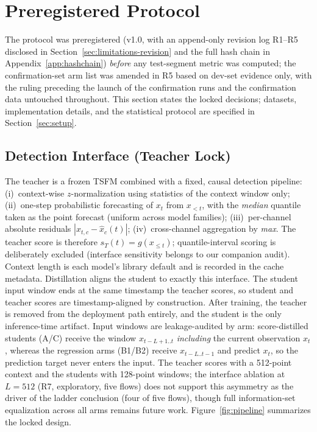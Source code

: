 \section{Preregistered Protocol}\label{sec:protocol}

The protocol was preregistered (v1.0, with an append-only revision log
R1--R5 disclosed in Section~\ref{sec:limitations-revision} and the full
hash chain in Appendix~\ref{app:hashchain}) \emph{before} any
test-segment metric was computed; the confirmation-set arm list was
amended in R5 based on dev-set evidence only, with the ruling preceding
the launch of the confirmation runs and the confirmation data untouched
throughout. This section states the locked decisions; datasets,
implementation details, and the statistical protocol are specified in
Section~\ref{sec:setup}.

\subsection{Detection Interface (Teacher Lock)}\label{sec:interface}
The teacher is a frozen TSFM combined with a fixed, causal detection
pipeline: (i)~context-wise $z$-normalization using statistics of the
context window only; (ii)~one-step probabilistic forecasting of $x_t$
from $x_{<t}$, with the \emph{median} quantile taken as the point
forecast (uniform across model families); (iii)~per-channel absolute
residuals $|x_{t,c}-\hat{x}_{c}(t)|$; (iv)~cross-channel aggregation by
\emph{max}. The teacher score is therefore $s_T(t)=g(x_{\le t})$;
quantile-interval scoring is deliberately excluded (interface
sensitivity belongs to our companion audit). Context length is each
model's library default and is recorded in the cache metadata.
Distillation aligns the student to exactly this interface. The student
input window ends at the same timestamp the teacher scores, so student
and teacher scores are timestamp-aligned by construction. After
training, the teacher is removed from the deployment path entirely, and the
student is the only inference-time artifact. Input windows are
leakage-audited by arm: score-distilled students (A/C) receive the
window $x_{t-L+1..t}$ \emph{including} the current observation $x_t$,
whereas the regression arms (B1/B2) receive $x_{t-L..t-1}$ and predict
$x_t$, so the prediction target never enters the input. The teacher
scores with a 512-point context and the students with 128-point
windows; the interface ablation at $L{=}512$ (R7, exploratory, five flows)
does not support this asymmetry as the driver of the ladder conclusion
(four of five flows), though full information-set
equalization across all arms remains future work. Figure~\ref{fig:pipeline} summarizes the locked design.

